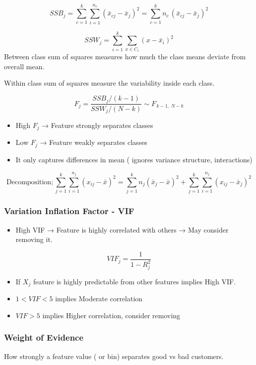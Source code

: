 \documentclass[10pt,a4paper]{article}
\begin{document}
	\[
	SSB_j = \sum_{c=1}^{k} \sum_{i=1}^{n_c} (\bar{x}_{c j} - \bar{x}_j)^2 = \sum_{c=1}^{k} n_c \, (\bar{x}_{c j} - \bar{x}_j)^2
	\]
	
	
	$$SSW_j = \sum_{i=1}^{k} \sum_{x \in C_i}^{} (x-\bar{x}_i)^2
	$$
	Between class sum of squares measures how much the class means deviate from overall mean.
	
	Within class sum of squares measure the variability inside each class.

	\[
	F_j = \frac{SSB_j/(k-1)}{SSW_j/(N-k)} \sim F_{\,k-1,\;N-k}
	\]
	
	\begin{itemize}
		\item High $F_j$ → Feature strongly separates classes
		\item Low $F_j$ → Feature weakly separates classes
		\item It only captures differences in mean ( ignores variance structure, interactions)
	\end{itemize}
	
	\[
	\text{Decomposition} ;  \sum_{j=1}^{k} \sum_{i=1}^{n_j} (x_{ij} - \bar{x})^2
	=
	\sum_{j=1}^{k} n_j (\bar{x}_j - \bar{x})^2
	+
	\sum_{j=1}^{k} \sum_{i=1}^{n_j} (x_{ij} - \bar{x}_j)^2
	\]

	\subsubsection{Variation Inflation Factor - VIF}

	\begin{itemize}
		\item High VIF → Feature is highly correlated with others → May consider removing it.
	\end{itemize}

	$$	VIF_j = \frac{1}{1-R_j^2}
	$$
	\begin{itemize}
		\item If $X_j$ feature is highly predictable from other features implies High VIF.
		\item $1 < VIF < 5$ implies Moderate correlation
		\item $VIF>5$ implies Higher correlation, consider removing
	\end{itemize}

	\subsubsection{Weight of Evidence}

	How strongly a feature value ( or bin) separates good vs bad customers.
\end{document}
